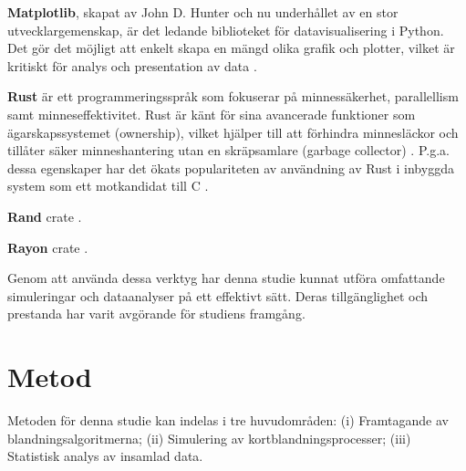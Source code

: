\documentclass[swedish,a4paper]{article}
\begin{document}
\textbf{Matplotlib}, skapat av John D. Hunter och nu underhållet av en stor
utvecklargemenskap, är det ledande biblioteket för datavisualisering i Python.
Det gör det möjligt att enkelt skapa en mängd olika grafik och plotter, vilket
är kritiskt för analys och presentation av data \parencite{matplotlib}.

\textbf{Rust} är ett programmeringsspråk som fokuserar på
minnessäkerhet, parallellism samt minneseffektivitet. Rust är känt för
sina avancerade funktioner som ägarskapssystemet (ownership), vilket
hjälper till att förhindra minnesläckor och tillåter säker
minneshantering utan en skräpsamlare (garbage collector)
\parencite{rust}. 
P.g.a. dessa egenskaper har det ökats populariteten av användning av Rust i
inbyggda system som ett motkandidat till C \parencite{sharma2023rust}.

\textbf{Rand} \gls{crate} \parencite{rand_crate}.

\textbf{Rayon} \gls{crate} \parencite{rayon_crate}. 

Genom att använda dessa verktyg har denna studie kunnat utföra omfattande
simuleringar och dataanalyser på ett effektivt sätt. Deras tillgänglighet och
prestanda har varit avgörande för studiens framgång.




\section{Metod} 
Metoden för denna studie kan indelas i tre huvudområden:
(i) Framtagande av  blandningsalgoritmerna;
(ii) Simulering av kortblandningsprocesser;
(iii) Statistisk analys av insamlad data.
\end{document}
